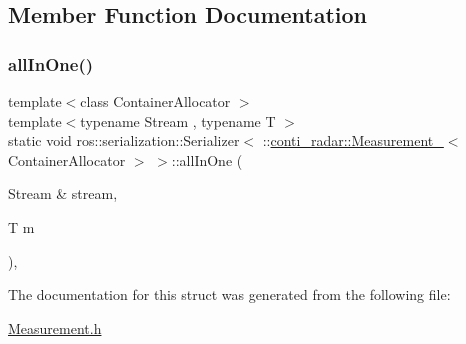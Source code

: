 \subsection{Member Function Documentation}
\mbox{\label{structros_1_1serialization_1_1Serializer_3_01_1_1conti__radar_1_1Measurement___3_01ContainerAllocator_01_4_01_4_af7d04f145cd734b738dcaf33c20ace99}} 
\subsubsection{\texorpdfstring{all\+In\+One()}{allInOne()}}
{\footnotesize\ttfamily template$<$class Container\+Allocator $>$ \\
template$<$typename Stream , typename T $>$ \\
static void ros\+::serialization\+::\+Serializer$<$ \+::\hyperlink{structconti__radar_1_1Measurement__}{conti\+\_\+radar\+::\+Measurement\+\_\+}$<$ Container\+Allocator $>$ $>$\+::all\+In\+One (\begin{DoxyParamCaption}\item[{Stream \&}]{stream,  }\item[{T}]{m }\end{DoxyParamCaption})\hspace{0.3cm}{\ttfamily [inline]}, {\ttfamily [static]}}



The documentation for this struct was generated from the following file\+:\begin{DoxyCompactItemize}
\item 
\hyperlink{Measurement_8h}{Measurement.\+h}\end{DoxyCompactItemize}
